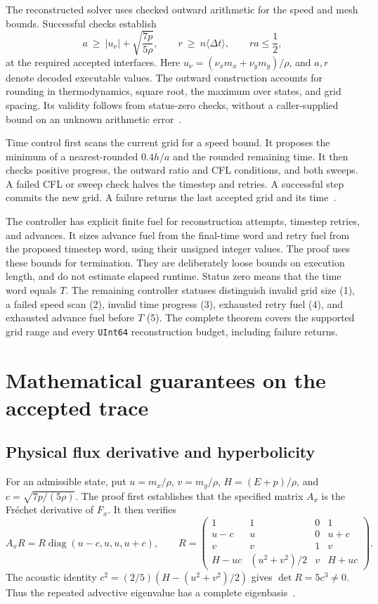 \documentclass[11pt]{article}
\newcommand{\code}[1]{\texttt{#1}}
\newcommand{\val}[1]{\langle #1\rangle}
\begin{document}
The reconstructed solver uses checked outward arithmetic for the speed and mesh bounds.  Successful checks establish
\begin{equation}
a\ \geq\ |u_\nu|+\sqrt{\frac{7p}{5\rho}},\qquad
r\ \geq\ n\val{\Delta t},\qquad ra\leq\frac12,\label{eq:cfl}
\end{equation}
at the required accepted interfaces.  Here $u_\nu=(\nu_xm_x+\nu_ym_y)/\rho$, and $a,r$ denote decoded executable values.  The outward construction accounts for rounding in thermodynamics, square root, the maximum over states, and grid spacing.  Its validity follows from status-zero checks, without a caller-supplied bound on an unknown arithmetic error~\cite{outward}.

Time control first scans the current grid for a speed bound.  It proposes the minimum of a nearest-rounded $0.4h/a$ and the rounded remaining time.  It then checks positive progress, the outward ratio and CFL conditions, and both sweeps.  A failed CFL or sweep check halves the timestep and retries.  A successful step commits the new grid.  A failure returns the last accepted grid and its time~\cite{control}.

The controller has explicit finite fuel for reconstruction attempts, timestep retries, and advances.  It sizes advance fuel from the final-time word and retry fuel from the proposed timestep word, using their unsigned integer values.  The proof uses these bounds for termination.  They are deliberately loose bounds on execution length, and do not estimate elapsed runtime.  Status zero means that the time word equals $T$.  The remaining controller statuses distinguish invalid grid size (1), a failed speed scan (2), invalid time progress (3), exhausted retry fuel (4), and exhausted advance fuel before $T$ (5).  The complete theorem covers the supported grid range and every \code{UInt64} reconstruction budget, including failure returns.

\section{Mathematical guarantees on the accepted trace}

\subsection{Physical flux derivative and hyperbolicity}

For an admissible state, put $u=m_x/\rho$, $v=m_y/\rho$, $H=(E+p)/\rho$, and $c=\sqrt{7p/(5\rho)}$.  The proof first establishes that the specified matrix $A_x$ is the Fr\'echet derivative of $F_x$.  It then verifies
\begin{equation}
A_xR=R\operatorname{diag}(u-c,u,u,u+c),\qquad
R=\begin{pmatrix}
1&1&0&1\\
u-c&u&0&u+c\\
v&v&1&v\\
H-uc&(u^2+v^2)/2&v&H+uc
\end{pmatrix}.
\end{equation}
The acoustic identity $c^2=(2/5)(H-(u^2+v^2)/2)$ gives $\det R=5c^3\ne0$.  Thus the repeated advective eigenvalue has a complete eigenbasis~\cite{hyperbolicity}.
\end{document}
